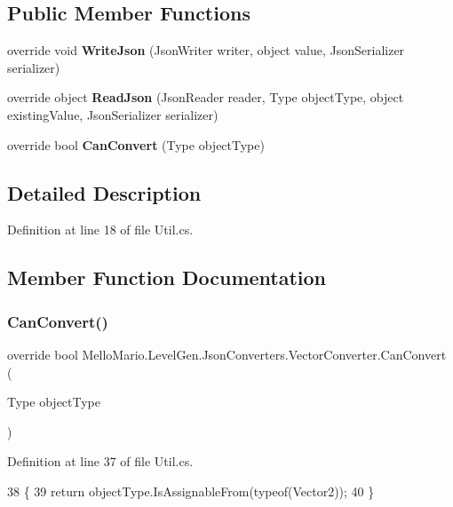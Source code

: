 \subsection*{Public Member Functions}
\begin{DoxyCompactItemize}
\item 
override void \textbf{ Write\+Json} (Json\+Writer writer, object value, Json\+Serializer serializer)
\item 
override object \textbf{ Read\+Json} (Json\+Reader reader, Type object\+Type, object existing\+Value, Json\+Serializer serializer)
\item 
override bool \textbf{ Can\+Convert} (Type object\+Type)
\end{DoxyCompactItemize}


\subsection{Detailed Description}


Definition at line 18 of file Util.\+cs.



\subsection{Member Function Documentation}
\mbox{\label{classMelloMario_1_1LevelGen_1_1JsonConverters_1_1VectorConverter_ad06a635fad020e661cc27e695d93bafe}} 
\subsubsection{Can\+Convert()}
{\footnotesize\ttfamily override bool Mello\+Mario.\+Level\+Gen.\+Json\+Converters.\+Vector\+Converter.\+Can\+Convert (\begin{DoxyParamCaption}\item[{Type}]{object\+Type }\end{DoxyParamCaption})}



Definition at line 37 of file Util.\+cs.


\begin{DoxyCode}
38         \{
39             \textcolor{keywordflow}{return} objectType.IsAssignableFrom(typeof(Vector2));
40         \}
\end{DoxyCode}
\mbox{\label{classMelloMario_1_1LevelGen_1_1JsonConverters_1_1VectorConverter_a3220b594d2f7a6d32fd34cf1ddc1b300}} 
